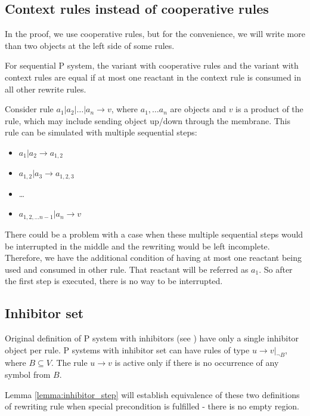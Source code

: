 \subsection{Context rules instead of cooperative rules}
  In the proof, we use cooperative rules, but for the convenience, we will write more than two objects at the left side of some rules.
  \begin{lemma}
  \label{lemma:context_rules}
    For sequential P system, the variant with cooperative rules and the variant with context rules are equal if at most one reactant in the context rule is consumed in all other rewrite rules.
  \end{lemma}
  \begin{dokaz}
    Consider rule $a_1|a_2|\dots|a_n \rightarrow v$, where $a_1,\dots a_n$ are objects and $v$ is a product of the rule, which may include sending object up/down through the membrane.
    This rule can be simulated with multiple sequential steps:
    \begin{itemize}
      \item $a_1|a_2 \rightarrow a_{1,2}$
      \item $a_{1,2}|a_3 \rightarrow a_{1,2,3}$
      \item \dots
      \item $a_{1,2,\dots n-1}|a_n \rightarrow v$
    \end{itemize}    
  \end{dokaz}
  There could be a problem with a case when these multiple sequential steps would be interrupted in the middle and the rewriting would be left incomplete. Therefore, we have the additional condition of having at most one reactant being used and consumed in other rule. That reactant will be referred as $a_1$. So after the first step is executed, there is no way to be interrupted.

\subsection{Inhibitor set}
Original definition of P system with inhibitors (see \cite{Ionescu:jucs_10_5:on_p_systems_with}) have only a single inhibitor object per rule. P systems with inhibitor set can have rules of type $u\rightarrow v|_{\neg B}$, where $B\subseteq V$. The rule $u\rightarrow v$ is active only if there is no occurrence of any symbol from $B$.

Lemma \ref{lemma:inhibitor_step} will establish equivalence of these two definitions of rewriting rule when special precondition is fulfilled - there is no empty region.

